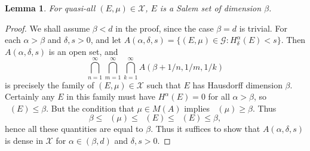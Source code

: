 \documentclass[12pt,reqno]{article}
\DeclareMathOperator{\hausdim}{\dim_{\mathbf{H}}}
\DeclareMathOperator{\fordim}{\dim_{\mathbf{F}}}
\newtheorem{lemma}[theorem]{Lemma}
\begin{document}
\begin{lemma}
    For quasi-all $(E,\mu) \in \mathcal{X}$, $E$ is a Salem set of dimension $\beta$.
\end{lemma}
\begin{proof}
    We shall assume $\beta < d$ in the proof, since the case $\beta = d$ is trivial. For each $\alpha > \beta$ and $\delta, s > 0$, and let $A(\alpha,\delta,s) = \{ (E,\mu) \in \mathcal{G}: H^\alpha_\delta(E) < s \}$. Then $A(\alpha,\delta,s)$ is an open set, and
    \[ \bigcap_{n = 1}^\infty \bigcap_{m = 1}^\infty \bigcap_{k = 1}^\infty A(\beta + 1/n, 1/m, 1/k) \]
    is precisely the family of $(E,\mu) \in \mathcal{X}$ such that $E$ has Hausdorff dimension $\beta$. Certainly any $E$ in this family must have $H^\alpha(E) = 0$ for all $\alpha > \beta$, so $\hausdim(E) \leq \beta$. But the condition that $\mu \in M(A)$ implies $\fordim(\mu) \geq \beta$. Thus
    \[ \beta \leq \fordim(\mu) \leq \fordim(E) \leq \hausdim(E) \leq \beta, \]
    hence all these quantities are equal to $\beta$. Thus it suffices to show that $A(\alpha,\delta,s)$ is dense in $\mathcal{X}$ for $\alpha \in (\beta,d)$ and $\delta, s > 0$.


\end{proof}
\end{document}
